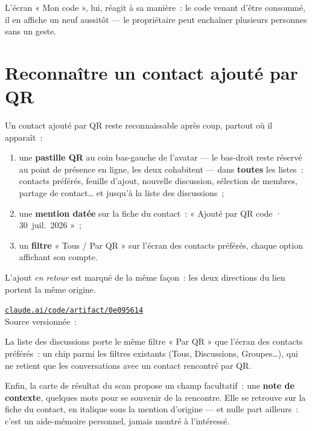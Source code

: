 L'écran « Mon code », lui, réagit à sa manière~: le code venant d'être consommé, il en
affiche un neuf aussitôt --- le propriétaire peut enchaîner plusieurs personnes sans un
geste.

\section{Reconnaître un contact ajouté par QR}

Un contact ajouté par QR reste reconnaissable après coup, partout où il apparaît~:

\begin{enumerate}[leftmargin=1.6em]
  \item une \textbf{pastille QR} au coin bas-gauche de l'avatar --- le bas-droit reste
        réservé au point de présence en ligne, les deux cohabitent --- dans
        \textbf{toutes} les listes~: contacts préférés, feuille d'ajout, nouvelle
        discussion, sélection de membres, partage de contact\ldots{} et jusqu'à la liste
        des discussions~;
  \item une \textbf{mention datée} sur la fiche du contact~: « Ajouté par QR code ·
        30~juil.~2026 »~;
  \item un \textbf{filtre} « Tous / Par QR » sur l'écran des contacts préférés, chaque
        option affichant son compte.
\end{enumerate}

L'ajout \emph{en retour} est marqué de la même façon~: les deux directions du lien
portent la même origine.

\begin{note}
\href{https://claude.ai/code/artifact/0e095614-eb7c-43bd-8f14-b0d15e61c139}%
{\texttt{claude.ai/code/artifact/0e095614}}\\
Source versionnée~: 
\end{note}


La liste des discussions porte le même filtre « Par QR » que l'écran des contacts
préférés~: un chip parmi les filtres existants (Tous, Discussions, Groupes…), qui ne
retient que les conversations avec un contact rencontré par QR.

Enfin, la carte de résultat du scan propose un champ facultatif~: une \textbf{note de
contexte}, quelques mots pour se souvenir de la rencontre. Elle se retrouve sur la fiche
du contact, en italique sous la mention d'origine --- et nulle part ailleurs~: c'est un
aide-mémoire personnel, jamais montré à l'intéressé.

